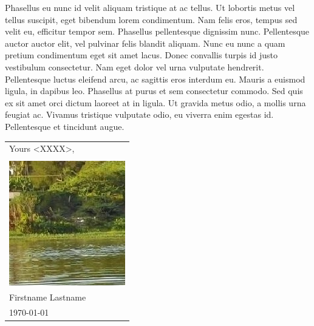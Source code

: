 \documentclass[bigfont, nodocument,nologo,black]{europasscv}
\newcommand{\signatureGraphics}{\includegraphics[scale=0.05]{photo.jpg}}%
\begin{document}
\begin{minipage}[t]{\linewidth}
\begin{europasscv}
\begin{singlespace*}
Phasellus eu nunc id velit aliquam tristique at ac tellus. Ut lobortis metus vel tellus suscipit, eget bibendum lorem condimentum. Nam felis eros, tempus sed velit eu, efficitur tempor sem. Phasellus pellentesque dignissim nunc. Pellentesque auctor auctor elit, vel pulvinar felis blandit aliquam. Nunc eu nunc a quam pretium condimentum eget sit amet lacus. Donec convallis turpis id justo vestibulum consectetur. Nam eget dolor vel urna vulputate hendrerit. Pellentesque luctus eleifend arcu, ac sagittis eros interdum eu. Mauris a euismod ligula, in dapibus leo. Phasellus at purus et sem consectetur commodo. Sed quis ex sit amet orci dictum laoreet at in ligula. Ut gravida metus odio, a mollis urna feugiat ac. Vivamus tristique vulputate odio, eu viverra enim egestas id. Pellentesque et tincidunt augue. 	\bigbreak	



		\end{singlespace*}	
	\end{europasscv}
\end{minipage}


\vfill
\hskip-0.52cm
\begin{tabular}{l}
Yours <XXXX>,\\ \\
\signatureGraphics\\
Firstname Lastname\\
\small\today \\
\end{tabular}
\hfill
\end{document}
